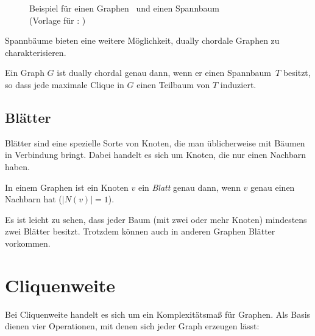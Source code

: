 \begin{figure}[htbp]
{
    }
    \hspace*{\fill}

    \caption[Beispiel für einen Graphen und einen Spannbaum]{Beispiel für einen Graphen~ und einen Spannbaum~ \\ (Vorlage für : \cite{wikiMedia:DistanceHereditaryGraph})}
    \label{pic:bsp_SpanningTree}
\end{figure}

Spannbäume bieten eine weitere Möglichkeit, dually chordale Graphen zu charakterisieren.

\begin{Theorem}\label{theo:DuallyChordalSpanningTree} \cite{duallyChordal}
    Ein Graph $G$ ist dually chordal genau dann, wenn er einen Spannbaum~$T$ besitzt, so dass jede maximale Clique in $G$ einen Teilbaum von $T$ induziert.
\end{Theorem}


\subsection{Blätter}
Blätter sind eine spezielle Sorte von Knoten, die man üblicherweise mit Bäumen in Verbindung bringt. Dabei handelt es sich um Knoten, die nur einen Nachbarn haben.

\begin{mydef}
    In einem Graphen ist ein Knoten $v$ ein \emph{Blatt} genau dann, wenn $v$ genau einen Nachbarn hat ($|N(v)|=1$).
\end{mydef}

Es ist leicht zu sehen, dass jeder Baum (mit zwei oder mehr Knoten) mindestens zwei Blätter besitzt. Trotzdem können auch in anderen Graphen Blätter vorkommen.




\section{Cliquenweite}

Bei Cliquenweite handelt es sich um ein Komplexitätsmaß für Graphen. Als Basis dienen vier Operationen, mit denen sich jeder Graph erzeugen lässt: 


